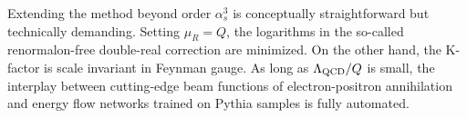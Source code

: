 Extending the method beyond order $\alpha_s^3$ is conceptually
straightforward but technically demanding. Setting $\mu_R = Q$, the
logarithms in the so-called renormalon-free double-real correction are
minimized. On the other hand, the K-factor is scale invariant in Feynman
gauge. As long as $\Lambda_{\rm QCD}/Q$ is small, the interplay between
cutting-edge beam functions of electron-positron annihilation and energy
flow networks trained on Pythia samples is fully automated.

